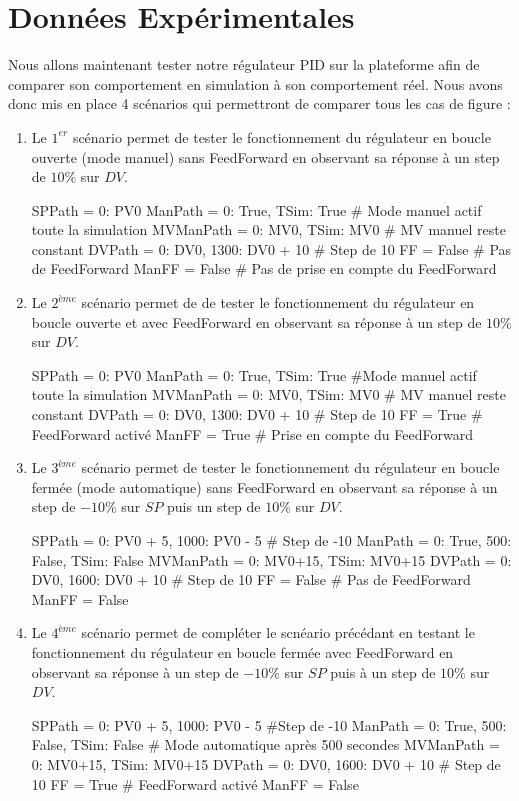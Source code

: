 \section{Données Expérimentales}

Nous allons maintenant tester notre régulateur PID sur la plateforme afin de comparer son comportement en 
simulation à son comportement réel. Nous avons donc mis en place 4 scénarios qui permettront de comparer 
tous les cas de figure : 
\begin{enumerate}
	\item Le $1^{er}$ scénario permet de tester le fonctionnement du régulateur en boucle ouverte (mode manuel) sans FeedForward en observant sa réponse à un step de $10\%$ sur $DV$.
	\begin{python*}
		SPPath = {0: PV0} 
		ManPath = {0: True, TSim: True} # Mode manuel actif toute la simulation
		MVManPath = {0: MV0, TSim: MV0} # MV manuel reste constant
		DVPath = {0: DV0, 1300: DV0 + 10} # Step de 10%
		FF = False # Pas de FeedForward
		ManFF = False # Pas de prise en compte du FeedForward 
	\end{python*}
	\item Le $2^{ème}$ scénario permet de de tester le fonctionnement du régulateur en boucle ouverte et avec FeedForward en observant 
	sa réponse à un step de $10\%$ sur $DV$.
	\begin{python*}
		SPPath = {0: PV0}
		ManPath = {0: True, TSim: True} #Mode manuel actif toute la simulation
		MVManPath = {0: MV0, TSim: MV0} # MV manuel reste constant
		DVPath = {0: DV0, 1300: DV0 + 10} # Step de 10%
		FF = True # FeedForward activé
		ManFF = True # Prise en compte du FeedForward
	\end{python*}
	\item Le $3^{ème}$ scénario permet de tester le fonctionnement du régulateur en boucle fermée (mode automatique) sans FeedForward en observant sa réponse
	à un step de $-10\%$ sur $SP$ puis un step de $10\%$ sur $DV$.
	\begin{python*}
		SPPath = {0: PV0 + 5, 1000: PV0 - 5} # Step de -10%
		ManPath = {0: True, 500: False, TSim: False} 
		MVManPath = {0: MV0+15, TSim: MV0+15}
		DVPath = {0: DV0, 1600: DV0 + 10} # Step de 10%
		FF = False # Pas de FeedForward
		ManFF = False 
	\end{python*}
	\item Le $4^{ème}$ scénario permet de compléter le scnéario précédant en testant le fonctionnement du régulateur en boucle fermée avec FeedForward en observant sa réponse à un step
	de $-10\%$ sur $SP$ puis à un step de $10\%$ sur $DV$.
	\begin{python*}
		SPPath = {0: PV0 + 5, 1000: PV0 - 5} #Step de -10%
		ManPath = {0: True, 500: False, TSim: False} # Mode automatique après 500 secondes
		MVManPath = {0: MV0+15, TSim: MV0+15} 
		DVPath = {0: DV0, 1600: DV0 + 10} # Step de 10%
		FF = True # FeedForward activé
		ManFF = False 
	\end{python*}
\end{enumerate}

